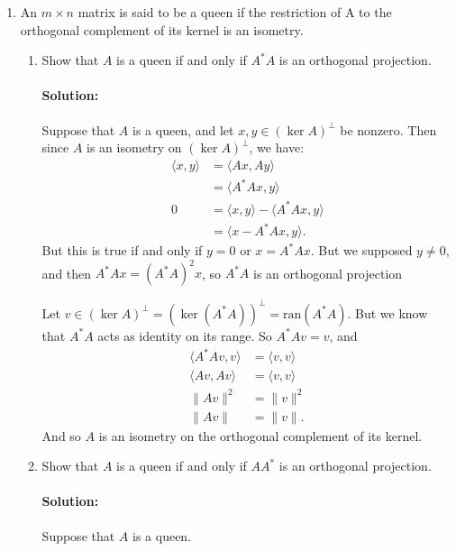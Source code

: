 \documentclass{article}
\begin{document}
\begin{enumerate} 

\item An $m \times n$ matrix is said to be a queen if the restriction of A to the orthogonal complement of its kernel is an isometry.

\begin{enumerate}[label= (\alph*)] 
\item Show that $A$ is a queen if and only if $A^* A$ is an orthogonal projection.
    \paragraph{Solution: }Suppose that $A$ is a queen, and let  $x,y\in (\ker A)^{\perp}$ be nonzero. Then since $A$ is an isometry on $(\ker A)^{\perp}$, we have:
    \begin{align*}
        \langle x,y \rangle&= \langle Ax,Ay \rangle \\
        &= \langle A^* Ax,y \rangle \\
        0&= \langle x,y \rangle-\langle A^* Ax,y \rangle\\
        &= \langle x-A^* Ax,y \rangle
    .\end{align*}
    But this is true if and only if $y=0$ or $x=A^* Ax$. But we supposed $y\neq 0$, and then $A^* Ax=(A^* A)^2x$, so $A^* A$ is an orthogonal projection %

    Let $v\in (\ker A)^{\perp}=(\ker(A^* A))^{\perp}=\text{ran}(A^* A)$. But we know that $A^* A$ acts as identity on its range. So $A^* Av=v$, and
    \begin{align*}
       \langle A^* Av,v \rangle&= \langle v,v \rangle \\
       \langle Av,Av \rangle&= \langle v,v \rangle \\
       \|Av\|^2&= \|v\|^2 \\
       \|Av\|&= \|v\|
    .\end{align*}
    And so $A$ is an isometry on the orthogonal complement of its kernel. %
\item Show that $A$ is a queen if and only if $AA^*$ is an orthogonal projection.
    \paragraph{Solution: }Suppose that $A$ is a queen. %


\end{enumerate}
\end{enumerate}
\end{document}
